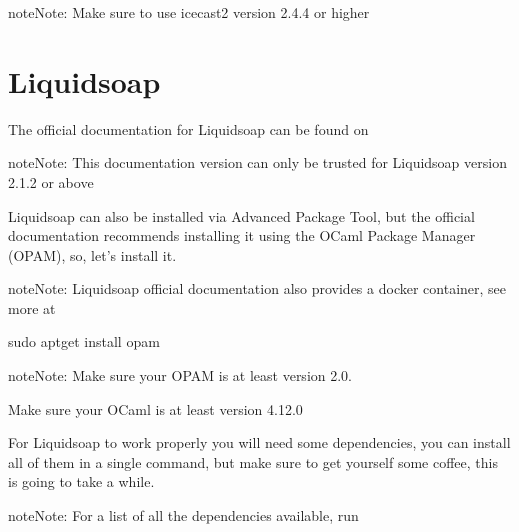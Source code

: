 \documentclass[letterpaper,10pt,english]{sphinxmanual}
\begin{document}
\begin{sphinxadmonition}{note}{Note:}
\sphinxAtStartPar
Make sure to use icecast2 version 2.4.4 or higher
\end{sphinxadmonition}


\section{Liquidsoap}
\label{\detokenize{server_install:liquidsoap}}
\sphinxAtStartPar
The official documentation for Liquidsoap can be found on 

\begin{sphinxadmonition}{note}{Note:}
\sphinxAtStartPar
This documentation version can only be trusted for Liquidsoap version 2.1.2 or above
\end{sphinxadmonition}

\sphinxAtStartPar
Liquidsoap can also be installed via Advanced Package Tool, but the official documentation
recommends installing it using the OCaml Package Manager (OPAM), so, let’s install it.

\begin{sphinxadmonition}{note}{Note:}
\sphinxAtStartPar
Liquidsoap official documentation also provides a docker container, see more at
\end{sphinxadmonition}

\begin{sphinxVerbatim}[commandchars=\\\{\}]
sudo apt\PYGZhy{}get install opam
\end{sphinxVerbatim}

\begin{sphinxadmonition}{note}{Note:}
\sphinxAtStartPar
Make sure your OPAM is at least version 2.0.

\sphinxAtStartPar
Make sure your OCaml is at least version 4.12.0
\end{sphinxadmonition}

\sphinxAtStartPar
For Liquidsoap to work properly you will need some dependencies, you can install all of them
in a single command, but make sure to get yourself some coffee, this is going to take a while.

\begin{sphinxadmonition}{note}{Note:}
\sphinxAtStartPar
For a list of all the dependencies available, run 
\end{sphinxadmonition}
\end{document}
